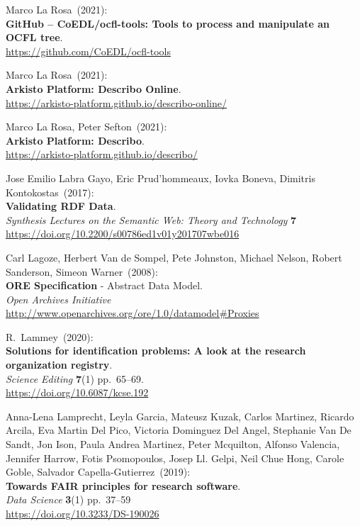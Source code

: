 \begin{thebibliography}{9}
Marco La Rosa~(2021): \\
\textbf{GitHub -- CoEDL/ocfl-tools: Tools to process and manipulate an OCFL tree}.\\
\url{https://github.com/CoEDL/ocfl-tools}

Marco La Rosa~(2021): \\
\textbf{Arkisto Platform: Describo Online}.\\
\url{https://arkisto-platform.github.io/describo-online/}

Marco La Rosa, Peter Sefton~(2021): \\
\textbf{Arkisto Platform: Describo}.\\
\url{https://arkisto-platform.github.io/describo/}

Jose Emilio Labra Gayo, Eric Prud'hommeaux, Iovka Boneva, Dimitris Kontokostas~(2017): \\
\textbf{Validating {RDF Data}}. \\
\emph{Synthesis Lectures on the Semantic Web: Theory and Technology} \textbf{7} \\
\url{https://doi.org/10.2200/s00786ed1v01y201707wbe016}

Carl Lagoze, Herbert Van de Sompel, Pete Johnston, Michael Nelson, Robert Sanderson, Simeon Warner~(2008): \\
\textbf{ORE Specification} - {Abstract Data Model}. \\
\emph{Open Archives Initiative}\\
\url{http://www.openarchives.org/ore/1.0/datamodel#Proxies} 

R.~Lammey~(2020): \\
\textbf{Solutions for identification problems: A look at the research organization registry}.\\
\emph{Science Editing} \textbf{7}(1) pp.~65--69.\\
\url{https://doi.org/10.6087/kcse.192}

Anna-Lena Lamprecht, Leyla Garcia, Mateusz Kuzak, Carlos Martinez, Ricardo Arcila, Eva Martin Del Pico, Victoria Dominguez Del Angel, Stephanie Van De Sandt, Jon Ison, Paula Andrea Martinez, Peter Mcquilton, Alfonso Valencia, Jennifer Harrow, Fotis Psomopoulos, Josep Ll. Gelpi, Neil Chue Hong, Carole Goble, Salvador Capella-Gutierrez~(2019): \\
\textbf{Towards FAIR principles for research software}.\\
\emph{Data Science} \textbf{3}(1) pp.~37--59\\
\url{https://doi.org/10.3233/DS-190026}


\end{thebibliography}
